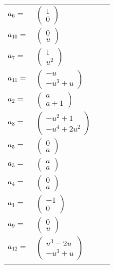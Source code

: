 \documentclass[1p]{elsarticle_modified}
\theoremstyle{definition}
\begin{document}
\begin{tabular}{m{7pt} m{180pt} m{7pt} m{180pt} }
\flushright $a_{6}=$&$\begin{pmatrix}1\\0\end{pmatrix}$ \\
\flushright $a_{10}=$&$\begin{pmatrix}0\\u\end{pmatrix}$ \\
\flushright $a_{7}=$&$\begin{pmatrix}1\\u^2\end{pmatrix}$ \\
\flushright $a_{11}=$&$\begin{pmatrix}- u\\- u^3+u\end{pmatrix}$ \\
\flushright $a_{2}=$&$\begin{pmatrix}a\\a+1\end{pmatrix}$ \\
\flushright $a_{8}=$&$\begin{pmatrix}- u^2+1\\- u^4+2 u^2\end{pmatrix}$ \\
\flushright $a_{5}=$&$\begin{pmatrix}0\\a\end{pmatrix}$ \\
\flushright $a_{3}=$&$\begin{pmatrix}a\\a\end{pmatrix}$ \\
\flushright $a_{4}=$&$\begin{pmatrix}0\\a\end{pmatrix}$ \\
\flushright $a_{1}=$&$\begin{pmatrix}-1\\0\end{pmatrix}$ \\
\flushright $a_{9}=$&$\begin{pmatrix}0\\u\end{pmatrix}$ \\
\flushright $a_{12}=$&$\begin{pmatrix}u^3-2 u\\- u^3+u\end{pmatrix}$\\&\end{tabular}
\end{document}

